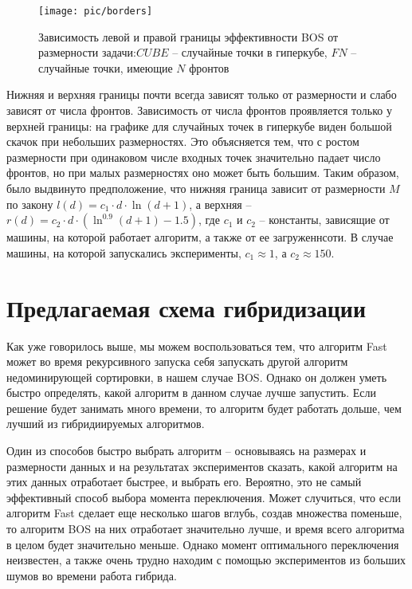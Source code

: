 \begin{figure}
\begin{center}
\texttt{[image: pic/borders]}
\caption{Зависимость левой и правой границы эффективности BOS от размерности задачи:$CUBE$ -- случайные точки в гиперкубе, $FN$ -- случайные точки, имеющие $N$ фронтов}
\label{borders}%
\end{center}
\end{figure}

Нижняя и верхняя границы почти всегда зависят только от размерности и слабо зависят от числа фронтов. Зависимость
от числа фронтов проявляется только у верхней границы: на графике для случайных точек в гиперкубе виден большой
скачок при небольших размерностях. Это объясняется тем, что с ростом размерности при одинаковом числе входных
точек значительно падает число фронтов, но при малых размерностях оно может быть большим. Таким образом, было
выдвинуто предположение, что нижняя граница зависит от размерности $M$ по закону $l(d) = c_1 \cdot d \cdot \ln(d + 1)$,
а верхняя -- $r(d) = c_2 \cdot d \cdot (\ln^{0.9}(d + 1) - 1.5)$, где $c_1$  и $c_2$ -- константы, зависящие от
машины, на которой работает алгоритм, а также от ее загруженнсоти. В случае машины, на которой запускались
эксперименты, $c_1 \approx 1$, а $c_2 \approx 150$.

\section{Предлагаемая схема гибридизации}

Как уже говорилось выше, мы можем воспользоваться тем, что алгоритм Fast может во время рекурсивного запуска
себя запускать другой алгоритм недоминирующей сортировки, в нашем случае BOS. Однако он должен уметь быстро
определять, какой алгоритм в данном случае лучше запустить. Если решение будет занимать много времени, то
алгоритм будет работать дольше, чем лучший из гибридиируемых алгоритмов.

Один из способов быстро выбрать алгоритм -- основываясь на размерах и размерности данных и на результатах
экспериментов сказать, какой алгоритм на этих данных отработает быстрее, и выбрать его. Вероятно, это не самый
эффективный способ выбора момента переключения. Может случиться, что если алгоритм Fast сделает еще несколько шагов
вглубь, создав множества поменьше, то алгоритм BOS на них отработает значительно лучше, и время всего алгоритма в
целом будет значительно меньше. Однако момент оптимального переключения неизвестен, а также очень трудно находим
с помощью экспериментов из больших шумов во времени работа гибрида.

